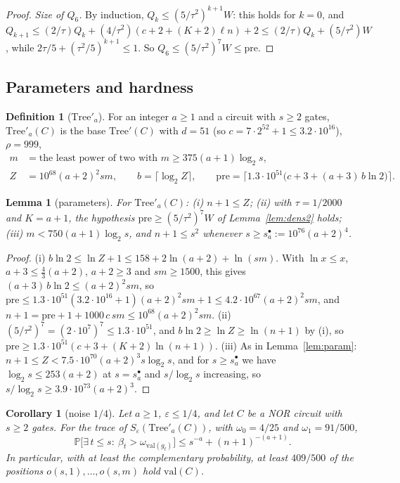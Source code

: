 \documentclass[11pt]{amsart}
\newtheorem{lemma}[theorem]{Lemma}
\newtheorem{corollary}[theorem]{Corollary}
\theoremstyle{definition}
\newtheorem{definition}[theorem]{Definition}
\theoremstyle{remark}
\newcommand{\eps}{\varepsilon}
\newcommand{\val}{\mathrm{val}}
\newcommand{\PP}{\mathbb{P}}
\begin{document}
\begin{proof}
\emph{Size of $Q_6$.} By induction, $Q_k\le(5/\tau^2)^{k+1}W$: this holds for $k=0$, and
$Q_{k+1}\le(2/\tau)Q_k+(4/\tau^2)(c+2+(K+2)\ell n)+2\le(2/\tau)Q_k+(5/\tau^2)W$, while
$2\tau/5+(\tau^2/5)^{k+1}\le1$. So $Q_6\le(5/\tau^2)^7W\le\mathrm{pre}$.
\end{proof}

\subsection{Parameters and hardness}

\begin{definition}[$\mathrm{Tree}'_a$]\label{def:treeprimea}
For an integer $a\ge1$ and a circuit with $s\ge2$ gates, $\mathrm{Tree}'_a(C)$ is the base
$\mathrm{Tree}'(C)$ with $d=51$ (so $c=7\cdot2^{52}+1\le3.2\cdot10^{16}$), $\rho=999$,
\begin{align*}
m&=\text{the least power of two with }m\ge375(a+1)\log_2s,\\
Z&=10^{68}(a+2)^2sm,\qquad b=\lceil\log_2Z\rceil,\qquad
\mathrm{pre}=\bigl\lceil1.3\cdot10^{51}\bigl(c+3+(a+3)\,b\ln2\bigr)\bigr\rceil .
\end{align*}
\end{definition}

\begin{lemma}[parameters]\label{lem:param3}
For $\mathrm{Tree}'_a(C)$: (i) $n+1\le Z$; (ii) with $\tau=1/2000$ and $K=a+1$, the hypothesis
$\mathrm{pre}\ge(5/\tau^2)^7W$ of Lemma~\ref{lem:dens2} holds; (iii) $m<750(a+1)\log_2s$, and
$n+1\le s^2$ whenever $s\ge s^\bullet_a:=10^{76}(a+2)^4$.
\end{lemma}

\begin{proof}
(i) $b\ln2\le\ln Z+1\le158+2\ln(a+2)+\ln(sm)$. With $\ln x\le x$, $a+3\le\frac43(a+2)$, $a+2\ge3$
and $sm\ge1500$, this gives $(a+3)\,b\ln2\le(a+2)^2sm$, so
$\mathrm{pre}\le1.3\cdot10^{51}(3.2\cdot10^{16}+1)(a+2)^2sm+1\le4.2\cdot10^{67}(a+2)^2sm$, and
$n+1=\mathrm{pre}+1+1000\,c\,sm\le10^{68}(a+2)^2sm$.
(ii) $(5/\tau^2)^7=(2\cdot10^7)^7\le1.3\cdot10^{51}$, and $b\ln2\ge\ln Z\ge\ln(n+1)$ by (i), so
$\mathrm{pre}\ge1.3\cdot10^{51}(c+3+(K+2)\ln(n+1))$.
(iii) As in Lemma~\ref{lem:param}: $n+1\le Z<7.5\cdot10^{70}(a+2)^3s\log_2s$, and for
$s\ge s^\bullet_a$ we have $\log_2s\le253(a+2)$ at $s=s^\bullet_a$ and $s/\log_2s$ increasing, so
$s/\log_2s\ge3.9\cdot10^{73}(a+2)^3$.
\end{proof}

\begin{corollary}[noise $1/4$]\label{cor:twentythree}
Let $a\ge1$, $\eps\le1/4$, and let $C$ be a NOR circuit with $s\ge2$ gates. For the trace of
$S_\eps(\mathrm{Tree}'_a(C))$, with $\omega_0=4/25$ and $\omega_1=91/500$,
\[
\PP\bigl[\exists\,t\le s:\ \beta_t>\omega_{\val(g_t)}\bigr]\le s^{-a}+(n+1)^{-(a+1)} .
\]
In particular, with at least the complementary probability, at least $409/500$ of the positions
$o(s,1),\dots,o(s,m)$ hold $\val(C)$.
\end{corollary}
\end{document}
